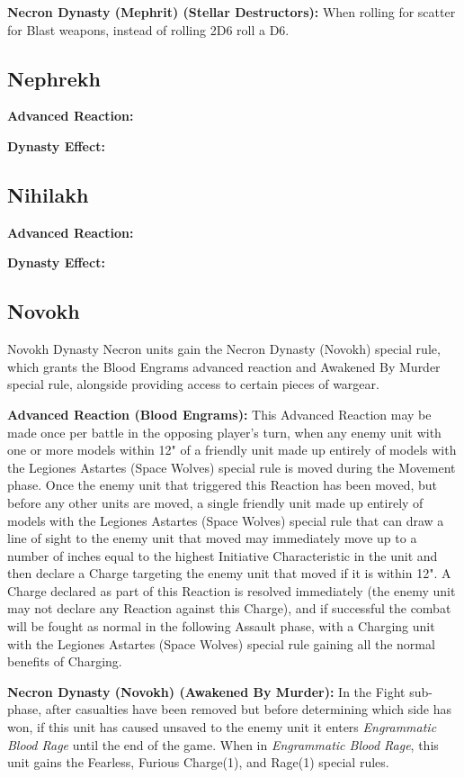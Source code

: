 \textbf{Necron Dynasty (Mephrit) (Stellar Destructors):} When rolling for scatter for Blast weapons, instead of rolling 2D6 roll a D6.


\subsection{Nephrekh}

\textbf{Advanced Reaction:}

\textbf{Dynasty Effect:}


\subsection{Nihilakh}

\textbf{Advanced Reaction:}

\textbf{Dynasty Effect:}


\subsection{Novokh}

Novokh Dynasty Necron units gain the Necron Dynasty (Novokh) special rule, which grants the Blood Engrams advanced reaction and Awakened By Murder special rule, alongside providing access to certain pieces of wargear.

\textbf{Advanced Reaction (Blood Engrams):} This Advanced Reaction may be made once per battle in the opposing player’s turn, when any enemy unit with one or more models within 12" of a friendly unit made up entirely of models with the Legiones Astartes (Space Wolves) special rule is moved during the Movement phase. Once the enemy unit that triggered this Reaction has been moved, but before any other units are moved, a single friendly unit made up entirely of models with the Legiones Astartes (Space Wolves) special rule that can draw a line of sight to the enemy unit that moved may immediately move up to a number of inches equal to the highest Initiative Characteristic in the unit and then declare a Charge targeting the enemy unit that moved if it is within 12". A Charge declared as part of this Reaction is resolved immediately (the enemy unit may not declare any Reaction against this Charge), and if successful the combat will be fought as normal in the following Assault phase, with a Charging unit with the Legiones Astartes (Space Wolves) special rule gaining all the normal benefits of Charging.

\textbf{Necron Dynasty (Novokh) (Awakened By Murder):} In the Fight sub-phase, after casualties have been removed but before determining which side has won, if this unit has caused unsaved to the enemy unit it enters \textit{Engrammatic Blood Rage} until the end of the game. When in \textit{Engrammatic Blood Rage}, this unit gains the Fearless, Furious Charge(1), and Rage(1) special rules.

